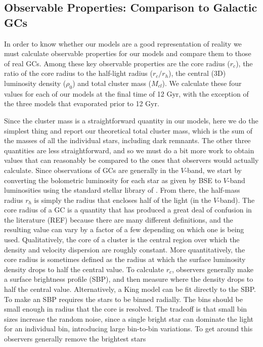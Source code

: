 \documentclass[12pt,preprint]{aastex}
\begin{document}
\subsection{Observable Properties: Comparison to Galactic GCs}

In order to know whether our models are a good representation of reality we must
calculate observable properties for our models and compare them to those of real
GCs. Among these key observable properties are the core radius ($r_c$), the ratio of the 
core radius to the half-light radius ($r_c / r_h$), the central (3D) luminosity 
density ($\rho_0$) and total cluster mass ($M_{cl}$). We calculate these four values
for each of our models at the final time of 12 Gyr, with the exception of the three models that evaporated
 prior to 12 Gyr.
 
Since the cluster mass is a straightforward quantity in our models, here we do the simplest 
thing and report our theoretical total cluster mass, which is the sum of the masses of all the individual stars, 
including dark remnants. The other three quantities are less straightforward, and so we must do a bit more work to obtain values that can reasonably be compared to the ones that observers would actually calculate. Since observations of GCs are generally in the $V$-band, we start by converting the bolometric luminosity for each star as given by BSE to $V$-band luminosities using the standard stellar library of \cite{Lejeune1998}. From there, the half-mass radius $r_h$ is simply the radius that encloses half of the light (in the $V$-band).
The core radius of a GC is a quantity that has produced a great deal of confusion in the literature (REF) because there are many different definitions, and the resulting value can vary by a factor of a few depending on which one is being used. Qualitatively, the core of a cluster is the central region over which the density and velocity dispersion are roughly constant. 
More quantitatively, the core radius is sometimes defined as the radius at which the surface luminosity density
drops to half the central value. To calculate $r_c$, observers generally make a surface brightness 
profile (SBP), and then measure where the density drops to half the central value. Alternatively, a King model can be fit directly to 
the SBP. To make an SBP requires the stars to be binned radially. The bins should be small enough in radius that the core is resolved. The tradeoff is that small bin sizes increase the random noise, since a single bright star can dominate the light
for an individual bin, introducing large bin-to-bin variations. To get around this observers generally remove the brightest stars
\end{document}

